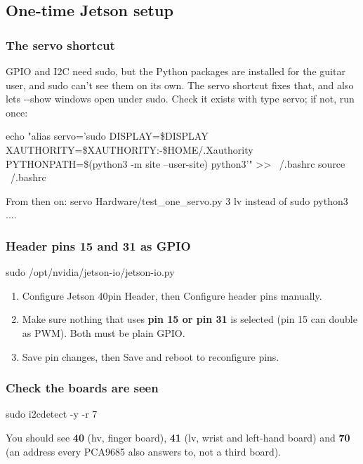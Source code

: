 \documentclass[11pt,letterpaper]{article}
\newcommand{\code}[1]{\textcolor{codeblue}{\ttfamily\smaller\relax #1}}
\begin{document}
\subsection{One-time Jetson setup}

\subsubsection*{The servo shortcut}
GPIO and I2C need sudo, but the Python packages are installed for the \code{guitar} user, and sudo can't see them on its own. The \code{servo} shortcut fixes that, and also lets \code{-{}-{}show} windows open under sudo. Check it exists with \code{type servo}; if not, run once:

\begin{codeblock}
echo "alias servo='sudo DISPLAY=\$DISPLAY XAUTHORITY=\${XAUTHORITY:-\$HOME/.Xauthority} PYTHONPATH=\$(python3 -m site --user-site) python3'" >> ~/.bashrc
source ~/.bashrc
\end{codeblock}
From then on: \code{servo Hardware/\allowbreak{}test\_\allowbreak{}one\_\allowbreak{}servo.py 3 lv} instead of \code{sudo python3 ...}.


\subsubsection*{Header pins 15 and 31 as GPIO}
\begin{codeblock}
sudo /opt/nvidia/jetson-io/jetson-io.py
\end{codeblock}
\begin{enumerate}
  \item Configure Jetson 40pin Header, then Configure header pins manually.
  \item Make sure nothing that uses \textbf{pin 15 or pin 31} is selected (pin 15 can double as PWM). Both must be plain GPIO.
  \item Save pin changes, then Save and reboot to reconfigure pins.
\end{enumerate}


\subsubsection*{Check the boards are seen}
\begin{codeblock}
sudo i2cdetect -y -r 7
\end{codeblock}
You should see \textbf{40} (\code{hv}, finger board), \textbf{41} (\code{lv}, wrist and left-hand board) and \textbf{70} (an address every PCA9685 also answers to, not a third board).
\end{document}
